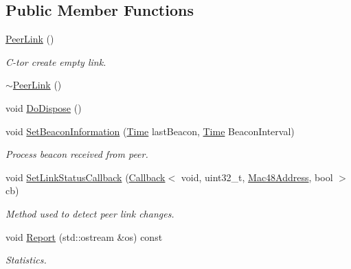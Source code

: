 \subsection*{Public Member Functions}
\begin{DoxyCompactItemize}
\item 
\hyperlink{classns3_1_1dot11s_1_1PeerLink_aa0cbf0138b4a52bc3feaea61968dff4a}{Peer\+Link} ()
\begin{DoxyCompactList}\small\item\em C-\/tor create empty link. \end{DoxyCompactList}\item 
\hyperlink{classns3_1_1dot11s_1_1PeerLink_aadebf5cb0e74bb02c5046f0f9769c40c}{$\sim$\+Peer\+Link} ()
\item 
void \hyperlink{classns3_1_1dot11s_1_1PeerLink_a2633f227958c60129248053629ceb533}{Do\+Dispose} ()
\item 
void \hyperlink{classns3_1_1dot11s_1_1PeerLink_a51f0de2b9bfd67d0f720e9a89d15912b}{Set\+Beacon\+Information} (\hyperlink{classns3_1_1Time}{Time} last\+Beacon, \hyperlink{classns3_1_1Time}{Time} Beacon\+Interval)
\begin{DoxyCompactList}\small\item\em Process beacon received from peer. \end{DoxyCompactList}\item 
void \hyperlink{classns3_1_1dot11s_1_1PeerLink_ac2f228b3aa5b8ec1df2059fb3bf40ad1}{Set\+Link\+Status\+Callback} (\hyperlink{classns3_1_1Callback}{Callback}$<$ void, uint32\+\_\+t, \hyperlink{classns3_1_1Mac48Address}{Mac48\+Address}, bool $>$ cb)
\begin{DoxyCompactList}\small\item\em Method used to detect peer link changes. \end{DoxyCompactList}\item 
void \hyperlink{classns3_1_1dot11s_1_1PeerLink_aba38f92dfd4d934d24e290d94af7be21}{Report} (std\+::ostream \&os) const 
\begin{DoxyCompactList}\small\item\em Statistics. \end{DoxyCompactList}\end{DoxyCompactItemize}
